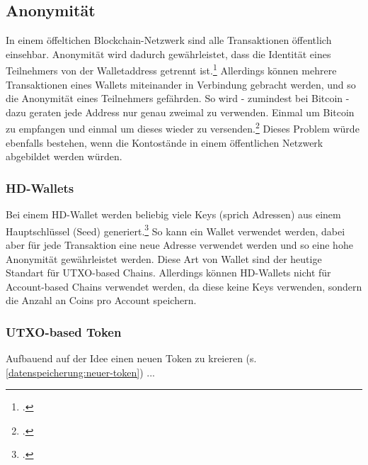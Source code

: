 \subsection{Anonymität}
In einem öffeltichen Blockchain-Netzwerk sind alle Transaktionen öffentlich einsehbar.
Anonymität wird dadurch gewährleistet, dass die Identität eines Teilnehmers von der Walletaddress getrennt ist.\footcite[Vgl.][6]{q4}
Allerdings können mehrere Transaktionen eines Wallets miteinander in Verbindung gebracht werden, und so die Anonymität eines Teilnehmers gefährden. So wird - zumindest bei Bitcoin - dazu geraten jede Address nur genau zweimal zu verwenden. Einmal um Bitcoin zu empfangen und einmal um dieses wieder zu versenden.\footcite[Vgl.][]{w15}
Dieses Problem würde ebenfalls bestehen, wenn die Kontostände in einem öffentlichen Netzwerk abgebildet werden würden.



\subsubsection{HD-Wallets}
Bei einem HD-Wallet werden beliebig viele Keys (sprich Adressen) aus einem Hauptschlüssel (Seed) generiert.\footcite[Vgl. hierzu und weiterführend][S. 8 ff\adddot]{q9}
So kann ein Wallet verwendet werden, dabei aber für jede Transaktion eine neue Adresse verwendet werden und so eine hohe Anonymität gewährleistet werden.
Diese Art von Wallet sind der heutige Standart für UTXO-based Chains.
Allerdings können HD-Wallets nicht für Account-based Chains verwendet werden, da diese keine Keys verwenden, sondern die Anzahl an Coins pro Account speichern.

\subsubsection{UTXO-based Token}
Aufbauend auf der Idee einen neuen Token zu kreieren (s. \ref{datenspeicherung:neuer-token}) ... 